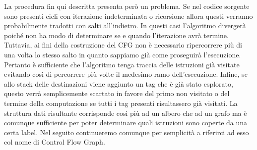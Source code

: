 \documentclass[12pt,a4paper,openright,oneside]{report}
\theoremstyle{definition}
\begin{document}
La procedura fin qui descritta presenta per\`{o} un problema. Se nel codice sorgente sono presenti cicli con iterazione indeterminata o ricorsione allora questi verranno probabilmente tradotti con salti all'indietro. In questi casi l'algoritmo diverger\`{a} poich\'{e} non ha modo di determinare se e quando l'iterazione avr\`{a} termine. Tuttavia, ai fini della costruzione del CFG non \`{e} necessario ripercorrere pi\`{u} di una volta lo stesso salto in quanto sappiamo gi\`{a} come proseguir\`{a} l'esecuzione. Pertanto \`{e} sufficiente che l'algoritmo tenga traccia delle istruzioni gi\`{a} visitate evitando cos\`{i} di percorrere pi\`{u} volte il medesimo ramo dell'esecuzione. Infine, se allo stack delle destinazioni viene aggiunto un tag che \`{e} gi\`{a} stato esplorato, questo verr\`{a} semplicemente scartato in favore del primo non visitato o del termine della computazione se tutti i tag presenti risultassero gi\`{a} visitati. La struttura dati risultante corrisponde cos\`{i} pi\`{u} ad un albero che ad un grafo ma \`{e} comunque sufficiente per poter determinare quali istruzioni sono coperte da una certa label. Nel seguito continueremo comunque per semplicit\`{a} a riferirci ad esso col nome di Control Flow Graph.
\end{document}
